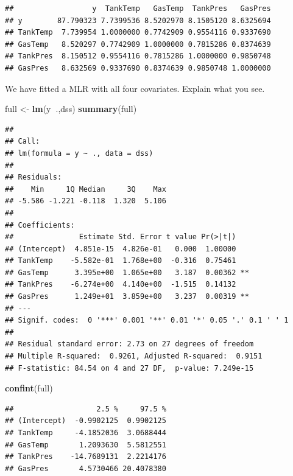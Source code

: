 \documentclass[
  ignorenonframetext,
]{beamer}
\newenvironment{Shaded}{\begin{snugshade}}{\end{snugshade}}
\newcommand{\KeywordTok}[1]{\textcolor[rgb]{0.13,0.29,0.53}{\textbf{#1}}}
\newcommand{\NormalTok}[1]{#1}
\newcommand{\OperatorTok}[1]{\textcolor[rgb]{0.81,0.36,0.00}{\textbf{#1}}}
\newcommand{\StringTok}[1]{\textcolor[rgb]{0.31,0.60,0.02}{#1}}
\begin{document}
\begin{frame}[fragile]
\begin{verbatim}
##                  y  TankTemp   GasTemp  TankPres   GasPres
## y        87.790323 7.7399536 8.5202970 8.1505120 8.6325694
## TankTemp  7.739954 1.0000000 0.7742909 0.9554116 0.9337690
## GasTemp   8.520297 0.7742909 1.0000000 0.7815286 0.8374639
## TankPres  8.150512 0.9554116 0.7815286 1.0000000 0.9850748
## GasPres   8.632569 0.9337690 0.8374639 0.9850748 1.0000000
\end{verbatim}

\end{frame}

\begin{frame}[fragile]

We have fitted a MLR with all four covariates. Explain what you see.

\begin{Shaded}
\begin{Highlighting}[]
\NormalTok{full <-}\StringTok{ }\KeywordTok{lm}\NormalTok{(y}\OperatorTok{~}\NormalTok{.,dss)}
\KeywordTok{summary}\NormalTok{(full)}
\end{Highlighting}
\end{Shaded}

\begin{verbatim}
## 
## Call:
## lm(formula = y ~ ., data = dss)
## 
## Residuals:
##    Min     1Q Median     3Q    Max 
## -5.586 -1.221 -0.118  1.320  5.106 
## 
## Coefficients:
##               Estimate Std. Error t value Pr(>|t|)   
## (Intercept)  4.851e-15  4.826e-01   0.000  1.00000   
## TankTemp    -5.582e-01  1.768e+00  -0.316  0.75461   
## GasTemp      3.395e+00  1.065e+00   3.187  0.00362 **
## TankPres    -6.274e+00  4.140e+00  -1.515  0.14132   
## GasPres      1.249e+01  3.859e+00   3.237  0.00319 **
## ---
## Signif. codes:  0 '***' 0.001 '**' 0.01 '*' 0.05 '.' 0.1 ' ' 1
## 
## Residual standard error: 2.73 on 27 degrees of freedom
## Multiple R-squared:  0.9261, Adjusted R-squared:  0.9151 
## F-statistic: 84.54 on 4 and 27 DF,  p-value: 7.249e-15
\end{verbatim}

\begin{Shaded}
\begin{Highlighting}[]
\KeywordTok{confint}\NormalTok{(full)}
\end{Highlighting}
\end{Shaded}

\begin{verbatim}
##                   2.5 %     97.5 %
## (Intercept)  -0.9902125  0.9902125
## TankTemp     -4.1852036  3.0688444
## GasTemp       1.2093630  5.5812551
## TankPres    -14.7689131  2.2214176
## GasPres       4.5730466 20.4078380
\end{verbatim}


\end{frame}
\end{document}

